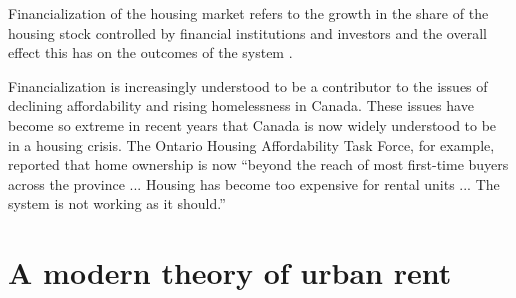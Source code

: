 Financialization of the housing market refers to the growth in the share of the housing stock controlled by financial institutions and investors and the overall effect this has on the outcomes of the system \cite{farhaReportFinancializationHousing2017, hansenFinanceCapitalismFinancialization2014}.  

Financialization is increasingly understood to be a contributor  to the issues of declining affordability and rising homelessness in Canada. These issues have become so extreme in recent years that Canada is now widely understood to be in a housing crisis. The Ontario Housing Affordability Task Force, for example, reported that home ownership is now ``beyond the reach of most first-time buyers across the province ... Housing has become too expensive for rental units ... The system is not working as it should.''


\section{A modern theory of urban rent}

